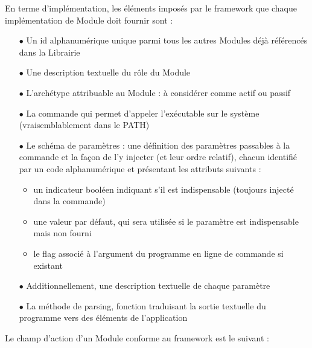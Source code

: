\documentclass[]{article}
\begin{document}
En terme d'implémentation, les éléments imposés par le framework que chaque implémentation de Module doit fournir sont :
\vspace{0.1cm} 
\begin{itemize}
\item[$\bullet$] Un id alphanumérique unique parmi tous les autres Modules déjà référencés dans la Librairie
\item[$\bullet$] Une description textuelle du rôle du Module
\item[$\bullet$] L'archétype attribuable au Module : à considérer comme actif ou passif
\item[$\bullet$] La commande qui permet d'appeler l'exécutable sur le système (vraisemblablement dans le PATH)
\item[$\bullet$] Le schéma de paramètres : une définition des paramètres passables à la commande et la façon de l'y injecter (et leur ordre relatif), chacun identifié par un code alphanumérique et présentant les attributs suivants :
\begin{itemize}
\item un indicateur booléen indiquant s'il est indispensable (toujours injecté dans la commande)
\item une valeur par défaut, qui sera utilisée si le paramètre est indispensable mais non fourni
\item le flag associé à l'argument du programme en ligne de commande si existant
\end{itemize}
\item[$\bullet$] Additionnellement, une description textuelle de chaque paramètre
\item[$\bullet$] La méthode de parsing, fonction traduisant la sortie textuelle du programme vers des éléments de l'application
\end{itemize}

\vspace{1cm}

Le champ d'action d'un Module conforme au framework est le suivant :
\end{document}
